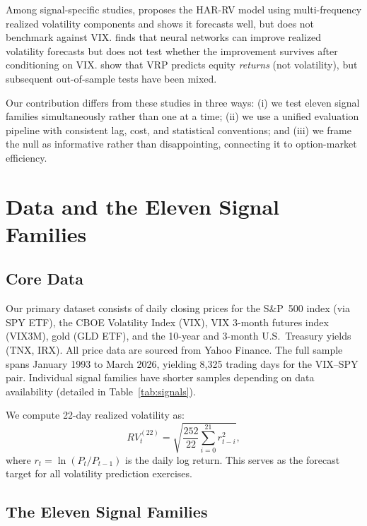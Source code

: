 \documentclass[12pt,a4paper]{article}
\begin{document}
Among signal-specific studies, \citet{corsi2009} proposes the HAR-RV model using multi-frequency realized volatility components and shows it forecasts well, but does not benchmark against VIX. \citet{bucci2020} finds that neural networks can improve realized volatility forecasts but does not test whether the improvement survives after conditioning on VIX. \citet{bollerslev2009} show that VRP predicts equity \emph{returns} (not volatility), but subsequent out-of-sample tests have been mixed.

Our contribution differs from these studies in three ways: (i) we test eleven signal families simultaneously rather than one at a time; (ii) we use a unified evaluation pipeline with consistent lag, cost, and statistical conventions; and (iii) we frame the null as informative rather than disappointing, connecting it to option-market efficiency.


\section{Data and the Eleven Signal Families}
\label{sec:data}

\subsection{Core Data}

Our primary dataset consists of daily closing prices for the S\&P~500 index (via SPY ETF), the CBOE Volatility Index (VIX), VIX 3-month futures index (VIX3M), gold (GLD ETF), and the 10-year and 3-month U.S.\ Treasury yields (TNX, IRX). All price data are sourced from Yahoo Finance. The full sample spans January 1993 to March 2026, yielding 8,325 trading days for the VIX--SPY pair. Individual signal families have shorter samples depending on data availability (detailed in Table~\ref{tab:signals}).

We compute 22-day realized volatility as:
\begin{equation}
RV_{t}^{(22)} = \sqrt{\frac{252}{22} \sum_{i=0}^{21} r_{t-i}^2},
\label{eq:rv}
\end{equation}
where $r_t = \ln(P_t/P_{t-1})$ is the daily log return. This serves as the forecast target for all volatility prediction exercises.

\subsection{The Eleven Signal Families}
\end{document}
